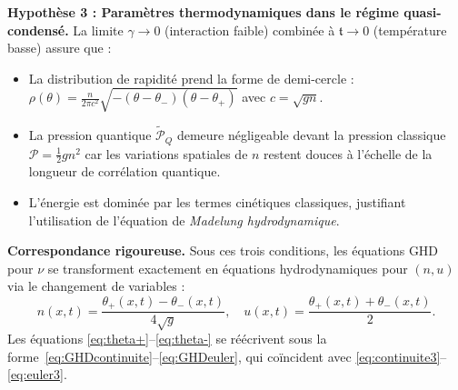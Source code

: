 {\medskip

\noindent\textbf{Hypothèse 3 : Paramètres thermodynamiques dans le régime quasi-condensé.}  
La limite $\gamma \to 0$ (interaction faible) combinée à $\mathfrak{t} \to 0$ (température basse) assure que :

\begin{itemize}[label=$\cdot$]
	\item La distribution de rapidité prend la forme de demi-cercle : $\rho(\theta) = \frac{n}{2\pi c^2}\sqrt{-(\theta-\theta_-)(\theta-\theta_+)}$ avec $c = \sqrt{gn}$.
	\item La pression quantique $\tilde{\mathcal{P}}_Q$ demeure négligeable devant la pression classique $\mathcal{P} = \frac{1}{2}gn^2$ car les variations spatiales de $n$ restent douces à l'échelle de la longueur de corrélation quantique.
	\item L'énergie est dominée par les termes cinétiques classiques, justifiant l'utilisation de l'équation de \emph{Madelung hydrodynamique}.
\end{itemize}

\medskip

\noindent\textbf{Correspondance rigoureuse.}  
Sous ces trois conditions, les équations \gls{GHD} pour $\nu$ se transforment exactement en équations hydrodynamiques pour $(n,u)$ via le changement de variables :
\begin{equation}
	n(x,t) = \frac{\theta_+(x,t) - \theta_-(x,t)}{4\sqrt{g}}, \quad u(x,t) = \frac{\theta_+(x,t) + \theta_-(x,t)}{2}.
\end{equation}
Les équations \eqref{eq:theta+}--\eqref{eq:theta-} se réécrivent sous la forme~\eqref{eq:GHDcontinuite}--\eqref{eq:GHDeuler}, qui coïncident avec \eqref{eq:continuite3}--\eqref{eq:euler3}.

\medskip

}
